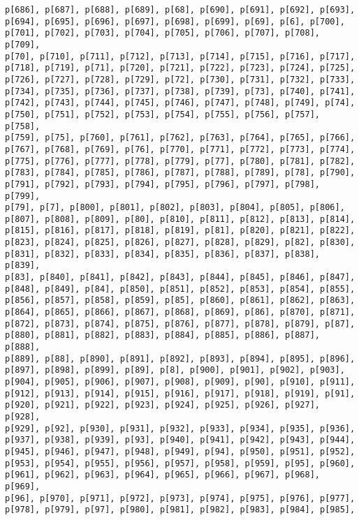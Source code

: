 \documentclass[
  letterpaper,
  DIV=11,
  numbers=noendperiod]{scrartcl}
\begin{document}
\begin{verbatim}
p[686], p[687], p[688], p[689], p[68], p[690], p[691], p[692], p[693],
p[694], p[695], p[696], p[697], p[698], p[699], p[69], p[6], p[700],
p[701], p[702], p[703], p[704], p[705], p[706], p[707], p[708], p[709],
p[70], p[710], p[711], p[712], p[713], p[714], p[715], p[716], p[717],
p[718], p[719], p[71], p[720], p[721], p[722], p[723], p[724], p[725],
p[726], p[727], p[728], p[729], p[72], p[730], p[731], p[732], p[733],
p[734], p[735], p[736], p[737], p[738], p[739], p[73], p[740], p[741],
p[742], p[743], p[744], p[745], p[746], p[747], p[748], p[749], p[74],
p[750], p[751], p[752], p[753], p[754], p[755], p[756], p[757], p[758],
p[759], p[75], p[760], p[761], p[762], p[763], p[764], p[765], p[766],
p[767], p[768], p[769], p[76], p[770], p[771], p[772], p[773], p[774],
p[775], p[776], p[777], p[778], p[779], p[77], p[780], p[781], p[782],
p[783], p[784], p[785], p[786], p[787], p[788], p[789], p[78], p[790],
p[791], p[792], p[793], p[794], p[795], p[796], p[797], p[798], p[799],
p[79], p[7], p[800], p[801], p[802], p[803], p[804], p[805], p[806],
p[807], p[808], p[809], p[80], p[810], p[811], p[812], p[813], p[814],
p[815], p[816], p[817], p[818], p[819], p[81], p[820], p[821], p[822],
p[823], p[824], p[825], p[826], p[827], p[828], p[829], p[82], p[830],
p[831], p[832], p[833], p[834], p[835], p[836], p[837], p[838], p[839],
p[83], p[840], p[841], p[842], p[843], p[844], p[845], p[846], p[847],
p[848], p[849], p[84], p[850], p[851], p[852], p[853], p[854], p[855],
p[856], p[857], p[858], p[859], p[85], p[860], p[861], p[862], p[863],
p[864], p[865], p[866], p[867], p[868], p[869], p[86], p[870], p[871],
p[872], p[873], p[874], p[875], p[876], p[877], p[878], p[879], p[87],
p[880], p[881], p[882], p[883], p[884], p[885], p[886], p[887], p[888],
p[889], p[88], p[890], p[891], p[892], p[893], p[894], p[895], p[896],
p[897], p[898], p[899], p[89], p[8], p[900], p[901], p[902], p[903],
p[904], p[905], p[906], p[907], p[908], p[909], p[90], p[910], p[911],
p[912], p[913], p[914], p[915], p[916], p[917], p[918], p[919], p[91],
p[920], p[921], p[922], p[923], p[924], p[925], p[926], p[927], p[928],
p[929], p[92], p[930], p[931], p[932], p[933], p[934], p[935], p[936],
p[937], p[938], p[939], p[93], p[940], p[941], p[942], p[943], p[944],
p[945], p[946], p[947], p[948], p[949], p[94], p[950], p[951], p[952],
p[953], p[954], p[955], p[956], p[957], p[958], p[959], p[95], p[960],
p[961], p[962], p[963], p[964], p[965], p[966], p[967], p[968], p[969],
p[96], p[970], p[971], p[972], p[973], p[974], p[975], p[976], p[977],
p[978], p[979], p[97], p[980], p[981], p[982], p[983], p[984], p[985],

\end{verbatim}
\end{document}
